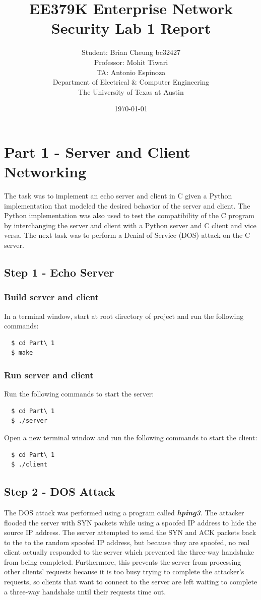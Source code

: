 \documentclass[11pt]{article}
\author{Student: Brian Cheung bc32427 \\ Professor: Mohit Tiwari \\ TA: Antonio Espinoza \\ Department of Electrical \& Computer Engineering \\ The University of Texas at Austin}
\date{\today}
\title{EE379K Enterprise Network Security Lab 1 Report}
\begin{document}
\maketitle
\section*{Part 1 - Server and Client Networking}
\label{sec:part-1}
The task was to implement an echo server and client in C given a Python implementation that modeled the desired behavior of the server and client.
The Python implementation was also used to test the compatibility of the C program by interchanging the server and client with a Python server and C client and vice versa.
The next task was to perform a Denial of Service (DOS) attack on the C server.
\subsection*{Step 1 - Echo Server}
\subsubsection*{Build server and client}
In a terminal window, start at root directory of project and run the following commands:
\begin{verbatim}
  $ cd Part\ 1
  $ make
\end{verbatim}
\subsubsection*{Run server and client}
Run the following commands to start the server:
\begin{verbatim}
  $ cd Part\ 1
  $ ./server
\end{verbatim}
Open a new terminal window and run the following commands to start the client:
\begin{verbatim}
  $ cd Part\ 1
  $ ./client
\end{verbatim}
\subsection*{Step 2 - DOS Attack}
The DOS attack was performed using a program called \textbf{\emph{hping3}}.
The attacker flooded the server with SYN packets while using a spoofed IP address to hide the source IP address.
The server attempted to send the SYN and ACK packets back to the to the random spoofed IP address, but because they are spoofed,
no real client actually responded to the server
which prevented the three-way handshake from being completed.
Furthermore, this prevents the server from processing other clients' requests because it is too busy trying to complete the attacker's requests,
so clients that want to connect to the server are left waiting to complete a three-way handshake until their requests time out.
\newline
\end{document}
